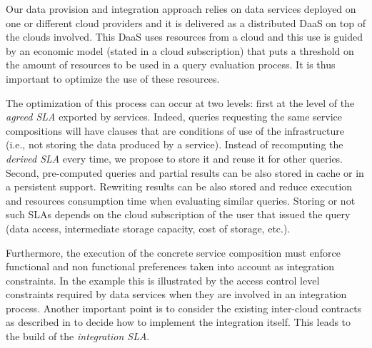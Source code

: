  Our data provision and integration approach relies on data services deployed on one or different cloud providers and it is delivered as a distributed DaaS on top of the clouds involved.  This DaaS  uses resources from a cloud and this use  is  guided by an economic model (stated in a cloud subscription) that puts a threshold on the amount of resources to be used in a query evaluation process. It is thus important to optimize the use of these resources. 
   
The optimization of this process can occur at two levels: first at the level of the {\em agreed SLA} exported by services.  Indeed, queries requesting the same service compositions will have clauses that are  conditions of use of the infrastructure (i.e., not storing the data produced by a service). Instead of recomputing the {\em derived SLA} every time, we propose to store it and reuse it for other queries. 
Second, pre-computed queries and partial results can be also stored in cache or in a persistent support. Rewriting results can be also stored and reduce execution and resources consumption time when evaluating similar queries. Storing or not such SLAs  depends on the cloud subscription of the user that issued the query (data access, intermediate storage capacity, cost of storage, etc.).


Furthermore, the execution of the concrete service composition  must enforce functional and non functional preferences taken into account as integration constraints. In the example this is illustrated by  the access control level constraints required by data services when they are involved in an integration process. Another important point is to consider the existing inter-cloud contracts as described in \cite{} to decide how to implement the integration itself. This leads to the build of the \textit{integration SLA}.
 

%
 
